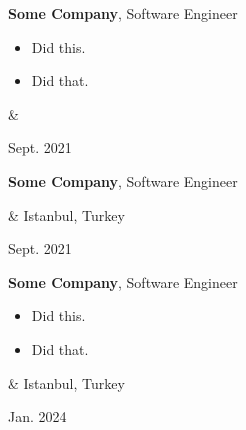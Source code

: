 \documentclass[10pt, letterpaper]{article}
\newenvironment{highlights}{
        \begin{itemize}[
                topsep=0pt,
                parsep=0.10 cm,
                partopsep=0pt,
                itemsep=0pt,
                after=\vspace{-1\baselineskip},
                leftmargin=0.4 cm + 3pt
            ]
    }{
        \end{itemize}
    } %
\let\originalTabularx\tabularx
\let\originalEndTabularx\endtabularx
\renewenvironment{tabularx}{\bgroup\centering\originalTabularx}{\originalEndTabularx\par\egroup}
\begin{document}
        \vspace{0.2 cm}
        \begin{tabularx}{
            \textwidth-0.4 cm-0.13cm
        }{
            K{0.2 cm}
            R{4.1 cm}
        }
            \textbf{Some Company}, Software Engineer

            \vspace{0.10 cm}

            \begin{highlights}
                \item Did this.
                \item Did that.
            \end{highlights}
            &
            

            Sept. 2021
        \end{tabularx}

        \vspace{0.2 cm}
        \begin{tabularx}{
            \textwidth-0.4 cm-0.13cm
        }{
            K{0.2 cm}
            R{4.1 cm}
        }
            \textbf{Some Company}, Software Engineer

            \vspace{0.10 cm}

            &
            Istanbul, Turkey

            Sept. 2021
        \end{tabularx}

        \vspace{0.2 cm}
        \begin{tabularx}{
            \textwidth-0.4 cm-0.13cm
        }{
            K{0.2 cm}
            R{4.1 cm}
        }
            \textbf{Some Company}, Software Engineer

            \vspace{0.10 cm}

            \begin{highlights}
                \item Did this.
                \item Did that.
            \end{highlights}
            &
            Istanbul, Turkey

            Jan. 2024
        \end{tabularx}
\end{document}
